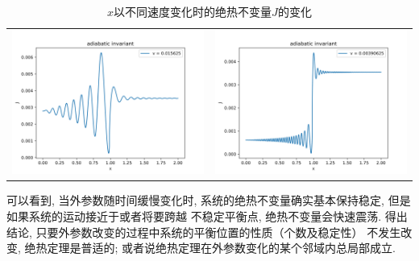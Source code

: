 \documentclass[a4paper,zihao=5,UTF8]{ctexart}
\begin{document}
\begin{table}[htbp]
\begin{tabular}[htbp]{cc}
            \includegraphics[scale=0.5]{2_ad_invr_v=0_015625.png} & \includegraphics[scale=0.5]{2_ad_invr_v=0_00390625.png}
        \end{tabular}
        \caption{$x$以不同速度变化时的绝热不变量$J$的变化}
        \label{v change J}
    \end{table}
    可以看到, 当外参数随时间缓慢变化时, 系统的绝热不变量确实基本保持稳定, 但是如果系统的运动接近于或者将要跨越
    不稳定平衡点, 绝热不变量会快速震荡. 得出结论, 只要外参数改变的过程中系统的平衡位置的性质（个数及稳定性）
    不发生改变, 绝热定理是普适的; 或者说绝热定理在外参数变化的某个邻域内总局部成立.
\end{document}

